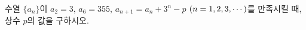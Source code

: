 수열 $\{a_n\}$이 $a_2=3$, $a_6=355$, $a_{n+1}=a_n+3^n-p$ $(n=1{,}\mkern3mu\mathopen{}2{,}\mkern3mu\mathopen{}3{,}\mkern3mu\mathopen{}\cdots)$를 만족시킬 때, 상수 $p$의 값을 구하시오.
